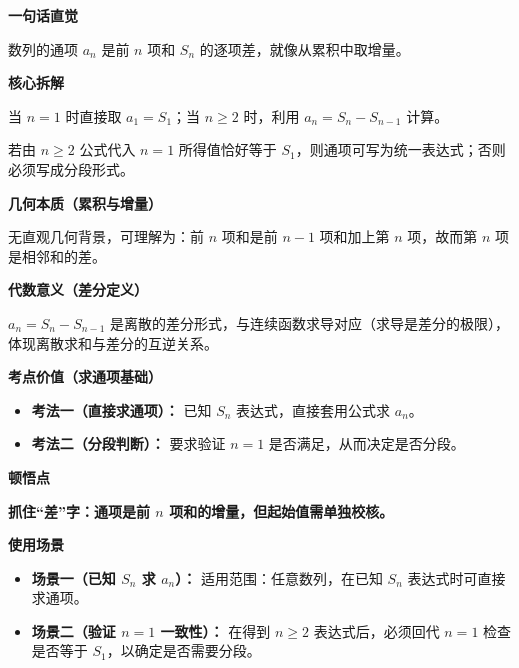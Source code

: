 \begin{explanationbox}

	\textbf{\textcolor{CExplanation}{一句话直觉}}

	数列的通项 $a_n$ 是前 $n$ 项和 $S_n$ 的逐项差，就像从累积中取增量。

	\medskip
	\textbf{\textcolor{CExplanation}{核心拆解}}
	\begin{description}[style=nextline, leftmargin=2.8em, labelsep=0.5em, itemsep=0.45em]
		\item[\textbf{要点一（分段求通项）：}] 当 $n=1$ 时直接取 $a_1=S_1$；当 $n\ge2$ 时，利用 $a_n=S_n-S_{n-1}$ 计算。
		\item[\textbf{要点二（验证合并条件）：}] 若由 $n\ge2$ 公式代入 $n=1$ 所得值恰好等于 $S_1$，则通项可写为统一表达式；否则必须写成分段形式。
	\end{description}

	\medskip
	\textbf{\textcolor{CExplanation}{几何本质（累积与增量）}}

	无直观几何背景，可理解为：前 $n$ 项和是前 $n-1$ 项和加上第 $n$ 项，故而第 $n$ 项是相邻和的差。

	\medskip
	\textbf{\textcolor{CExplanation}{代数意义（差分定义）}}

	$a_n=S_n-S_{n-1}$ 是离散的差分形式，与连续函数求导对应（求导是差分的极限），体现离散求和与差分的互逆关系。

	\medskip
	\textbf{\textcolor{CExplanation}{考点价值（求通项基础）}}
	\begin{itemize}[leftmargin=*, itemsep=0.5em, topsep=0.4em]
		\item \textbf{考法一（直接求通项）：} 已知 $S_n$ 表达式，直接套用公式求 $a_n$。
		\item \textbf{考法二（分段判断）：} 要求验证 $n=1$ 是否满足，从而决定是否分段。
	\end{itemize}

	\medskip
	\textbf{\textcolor{CExplanation}{顿悟点}}

	\textbf{抓住“差”字：通项是前 $n$ 项和的增量，但起始值需单独校核。}

	\medskip
	\textbf{\textcolor{CExplanation}{使用场景}}
	\begin{itemize}[leftmargin=*, itemsep=0.5em, topsep=0.4em]
		\item \textbf{场景一（已知 $S_n$ 求 $a_n$）：} 适用范围：任意数列，在已知 $S_n$ 表达式时可直接求通项。
		\item \textbf{场景二（验证 $n=1$ 一致性）：} 在得到 $n\ge2$ 表达式后，必须回代 $n=1$ 检查是否等于 $S_1$，以确定是否需要分段。
	\end{itemize}
\end{explanationbox}
